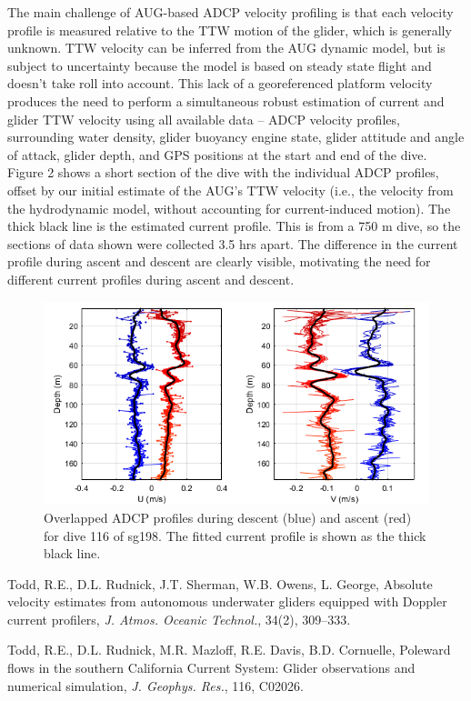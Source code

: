 The main challenge of AUG-based ADCP velocity profiling is that each velocity profile is measured relative to the TTW motion of the glider, which is generally unknown. TTW velocity can be inferred from the AUG dynamic model, but is subject to uncertainty because the model is based on steady state flight and doesn't take roll into account. This lack of a georeferenced platform velocity produces the need to perform a simultaneous robust estimation of current and glider TTW velocity using all available data -- ADCP velocity profiles, surrounding water density, glider buoyancy engine state, glider attitude and angle of attack, glider depth, and GPS positions at the start and end of the dive. Figure 2 shows a short section of the dive with the individual ADCP profiles, offset by our initial estimate of the AUG's TTW velocity (i.e., the velocity from the hydrodynamic model, without accounting for current-induced motion). The thick black line is the estimated current profile. This is from a 750 m dive, so the sections of data shown were collected 3.5 hrs apart. The difference in the current profile during ascent and descent are clearly visible, motivating the need for different current profiles during ascent and descent.

\begin{figure}[!ht]
  \centering
  \includegraphics[width=\columnwidth]{./figs/current_profile_snip.png}
  \vspace{-0.1in}
  \caption{ Overlapped ADCP profiles during descent (blue) and ascent (red) for dive 116 of sg198. The fitted current profile is shown as the thick black line.}
  \label{fig.profile_snip}
   \vspace{-0.1in}
\end{figure}

\begin{thebibliography}{1}

Todd, R.E., D.L. Rudnick, J.T. Sherman, W.B. Owens, L. George, Absolute velocity estimates from autonomous underwater gliders equipped with Doppler current profilers, \emph{J. Atmos. Oceanic Technol.}, 34(2), 309–333.%

Todd, R.E., D.L. Rudnick, M.R. Mazloff, R.E. Davis, B.D. Cornuelle, Poleward flows in the southern California Current System: Glider observations and numerical simulation, \emph{J. Geophys. Res.}, 116, C02026. %

\end{thebibliography}
